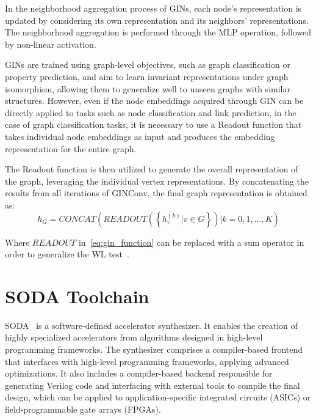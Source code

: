 In the neighborhood aggregation process of GINs, each node's representation is updated by considering its own representation and its neighbors' representations.
The neighborhood aggregation is performed through the MLP operation, followed by non-linear activation.

GINs are trained using graph-level objectives, such as graph classification or property prediction, and aim to learn invariant representations under graph isomorphism, allowing them to generalize well to unseen graphs with similar structures.
However, even if the node embeddings acquired through GIN can be directly applied to tasks such as node classification and link prediction, in the case of graph classification tasks, it is necessary to use a Readout function that takes individual node embeddings as input and produces the embedding representation for the entire graph.

The Readout function is then utilized to generate the overall representation of the graph, leveraging the individual vertex representations.
By concatenating the results from all iterations of GINConv, the final graph representation is obtained as:
\begin{equation}
    \label{eq:gin_readout}
    h_G = CONCAT \left( READOUT \left( \left\{ h_v^{(k)} | v \in G \right\} \right) | k = 0, 1, ..., K \right)
\end{equation}

Where $READOUT$ in~\ref{eq:gin_function} can be replaced with a sum operator in order to generalize the WL test~\cite{xu2019powerful}.


\section{SODA Toolchain}
\label{sec:soda}%

SODA~\cite{9786533} is a software-defined accelerator synthesizer.
It enables the creation of highly specialized accelerators from algorithms designed in high-level programming frameworks.
The synthesizer comprises a compiler-based frontend that interfaces with high-level programming frameworks, applying advanced optimizations.
It also includes a compiler-based backend responsible for generating Verilog code and interfacing with external tools to compile the final design, which can be applied to application-specific integrated circuits (ASICs) or field-programmable gate arrays (FPGAs).

